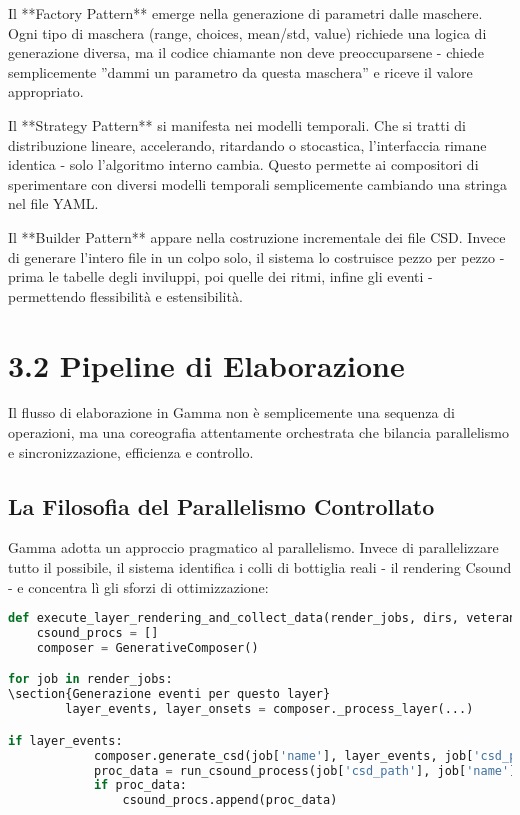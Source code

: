 Il **Factory Pattern** emerge nella generazione di parametri dalle maschere. Ogni tipo di maschera (range, choices, mean/std, value) richiede una logica di generazione diversa, ma il codice chiamante non deve preoccuparsene - chiede semplicemente ''dammi un parametro da questa maschera'' e riceve il valore appropriato.

Il **Strategy Pattern** si manifesta nei modelli temporali. Che si tratti di distribuzione lineare, accelerando, ritardando o stocastica, l'interfaccia rimane identica - solo l'algoritmo interno cambia. Questo permette ai compositori di sperimentare con diversi modelli temporali semplicemente cambiando una stringa nel file YAML.

Il **Builder Pattern** appare nella costruzione incrementale dei file CSD. Invece di generare l'intero file in un colpo solo, il sistema lo costruisce pezzo per pezzo - prima le tabelle degli inviluppi, poi quelle dei ritmi, infine gli eventi - permettendo flessibilità e estensibilità.
\section{3.2 Pipeline di Elaborazione}
Il flusso di elaborazione in Gamma non è semplicemente una sequenza di operazioni, ma una coreografia attentamente orchestrata che bilancia parallelismo e sincronizzazione, efficienza e controllo.
\subsection{La Filosofia del Parallelismo Controllato}
Gamma adotta un approccio pragmatico al parallelismo. Invece di parallelizzare tutto il possibile, il sistema identifica i colli di bottiglia reali - il rendering Csound - e concentra lì gli sforzi di ottimizzazione:

\begin{lstlisting}[language=Python]
def execute_layer_rendering_and_collect_data(render_jobs, dirs, veteran_mode_active):
    csound_procs = []
    composer = GenerativeComposer()

for job in render_jobs:
\section{Generazione eventi per questo layer}
        layer_events, layer_onsets = composer._process_layer(...)

if layer_events:
            composer.generate_csd(job['name'], layer_events, job['csd_path'], job['wav_path'])
            proc_data = run_csound_process(job['csd_path'], job['name'], dirs['logs'])
            if proc_data: 
                csound_procs.append(proc_data)
\end{lstlisting}

